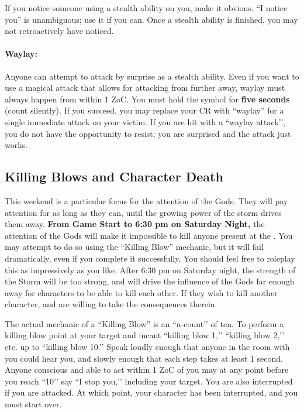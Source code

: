 \documentclass[sheet]{GL2020}
\begin{document}
If you notice someone using a stealth ability on you, make it obvious. ``I notice you'' is unambiguous; use it if you can. Once a stealth ability is finished, you may not retroactively have noticed.

\paragraph{Waylay:} Anyone can attempt to attack by surprise as a stealth ability. Even if you want to use a magical attack that allows for attacking from further away, waylay must always happen from within 1 ZoC. You must hold the symbol for \textbf{five seconds} (count silently). If you succeed, you may replace your CR with ``waylay'' for a single immediate attack on your victim. If you are hit with a ``waylay attack’’, you do not have the opportunity to resist; you are surprised and the attack just works.

\subsection{Killing Blows and Character Death}

This weekend is a particular focus for the attention of the Gods. They will pay attention for as long as they can, until the growing power of the storm drives them away. \textbf{From Game Start to 6:30 pm on Saturday Night,} the attention of the Gods will make it impossible to kill anyone present at the \pSc{}. You may attempt to do so using the ``Killing Blow'' mechanic, but it will fail dramatically, even if you complete it successfully. You should feel free to roleplay this as impressively as you like. After 6:30 pm on Saturday night, the strength of the Storm will be too strong, and will drive the influence of the Gods far enough away for characters to be able to kill each other. If they wish to kill another character, and are willing to take the consequences therein.

The actual mechanic of a ``Killing Blow'' is an ``n-count’’ of ten. To perform a killing blow point at your target and incant ``killing blow 1,’’ ``killing blow 2,’’ etc. up to ``killing blow 10.’’ Speak loudly enough that anyone in the room with you could hear you, and slowly enough that each step takes at least 1 second. Anyone conscious and able to act within 1 ZoC of you may at any point before you reach ``10’’ say ``I stop you,’’ including your target. You are also interrupted if you are attacked. At which point, your character has been interrupted, and you must start over.
\end{document}
